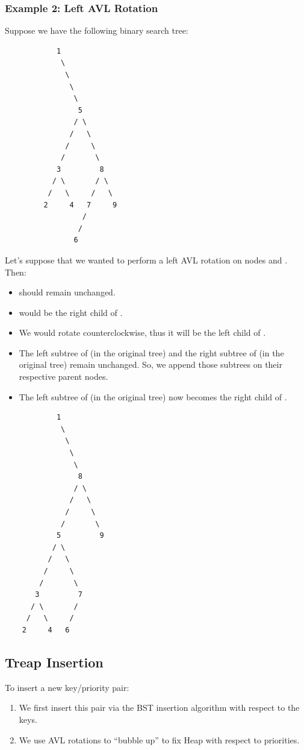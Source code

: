\documentclass[letterpaper]{article}
\begin{document}
\subsubsection{Example 2: Left AVL Rotation}
Suppose we have the following binary search tree: 
\begin{verbatim}
            1
             \ 
              \ 
               \ 
                \ 
                 5 
                / \ 
               /   \
              /     \ 
             /       \ 
            3         8
           / \       / \ 
          /   \     /   \ 
         2     4   7     9
                  /
                 /
                6
\end{verbatim}
Let's suppose that we wanted to perform a left AVL rotation on nodes  and . Then: 
\begin{itemize}
    \item {} should remain unchanged. 
    \item \code{8} would be the right child of \code{1}.
    \item We would rotate  counterclockwise, thus it will be the left child of .
    \item The left subtree of  (in the original tree) and the right subtree of  (in the original tree) remain unchanged. So, we append those subtrees on their respective parent nodes.
    \item The left subtree of  (in the original tree) now becomes the right child of .
\end{itemize}

\begin{verbatim}
            1
             \
              \ 
               \ 
                \ 
                 8 
                / \ 
               /   \ 
              /     \ 
             /       \
            5         9
           / \
          /   \
         /     \ 
        /       \ 
       3         7
      / \       /
     /   \     /
    2     4   6
\end{verbatim}

\subsection{Treap Insertion}
To insert a new key/priority pair: 
\begin{enumerate}[(1)]
    \item We first insert this pair via the BST insertion algorithm with respect to the keys. 
    \item We use AVL rotations to ``bubble up'' to fix Heap with respect to priorities. 
\end{enumerate}
\end{document}
